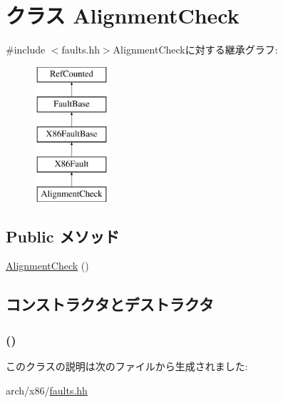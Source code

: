 \hypertarget{classX86ISA_1_1AlignmentCheck}{
\section{クラス AlignmentCheck}
\label{classX86ISA_1_1AlignmentCheck}
}


{\ttfamily \#include $<$faults.hh$>$}AlignmentCheckに対する継承グラフ:\begin{figure}[H]
\begin{center}
\leavevmode
\includegraphics[height=5cm]{classX86ISA_1_1AlignmentCheck}
\end{center}
\end{figure}
\subsection*{Public メソッド}
\begin{DoxyCompactItemize}
\item 
\hyperlink{classX86ISA_1_1AlignmentCheck_a00a5d9d48172f7673fd3e44365a81fe7}{AlignmentCheck} ()
\end{DoxyCompactItemize}


\subsection{コンストラクタとデストラクタ}
\hypertarget{classX86ISA_1_1AlignmentCheck_a00a5d9d48172f7673fd3e44365a81fe7}{
\subsubsection[{AlignmentCheck}]{ ()}}
\label{classX86ISA_1_1AlignmentCheck_a00a5d9d48172f7673fd3e44365a81fe7}



\begin{DoxyCode}
351                          :
352             X86Fault("Alignment-Check", "#AC", 17, 0)
353         {}
    };
\end{DoxyCode}


このクラスの説明は次のファイルから生成されました:\begin{DoxyCompactItemize}
\item 
arch/x86/\hyperlink{arch_2x86_2faults_8hh}{faults.hh}\end{DoxyCompactItemize}
